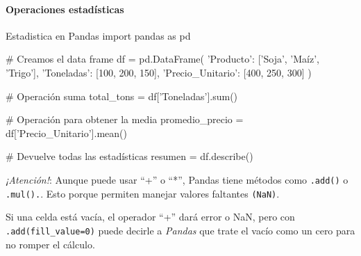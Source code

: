\paragraph{Operaciones estadísticas}

\begin{pycode}{Estadistica en Pandas}
import pandas as pd

# Creamos el data frame
df = pd.DataFrame({
'Producto': ['Soja', 'Maíz', 'Trigo'],
'Toneladas': [100, 200, 150],
'Precio_Unitario': [400, 250, 300]
})

# Operación suma
total_tons = df['Toneladas'].sum()

# Operación para obtener la media
promedio_precio = df['Precio_Unitario'].mean()

# Devuelve todas las estadísticas
resumen = df.describe()
\end{pycode}


\begin{nota}
    \textit{¡Atención!}: Aunque puede usar ``+'' o ``*'', Pandas tiene métodos como \texttt{.add()} o \texttt{.mul().}. Esto porque permiten manejar valores faltantes \texttt{(NaN)}. 
    
    Si una celda está vacía, el operador ``+'' dará error o NaN, pero con \texttt{.add(fill\_value=0)} puede decirle a \textit{Pandas} que trate el vacío como un cero para no romper el cálculo.
\end{nota}